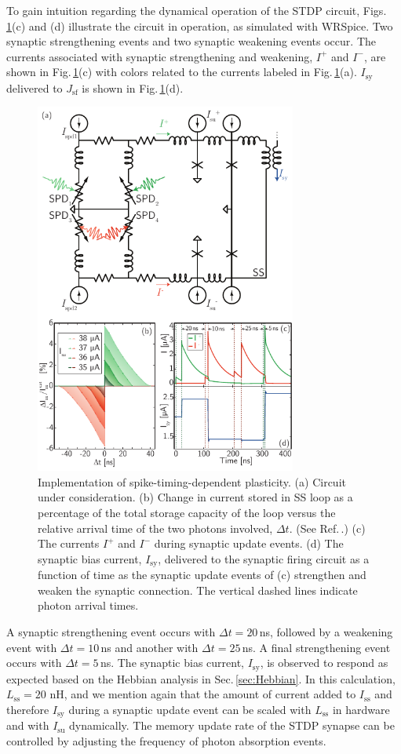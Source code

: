 \documentclass[aip,amsmath,amssymb,reprint,nofootinbib]{revtex4-1}
\begin{document}
To gain intuition regarding the dynamical operation of the STDP circuit, Figs.\,\ref{fig:synapticPlasticity_stdp}(c) and (d) illustrate the circuit in operation, as simulated with WRSpice. Two synaptic strengthening events and two synaptic weakening events occur. The currents associated with synaptic strengthening and weakening, $I^+$ and $I^-$, are shown in Fig.\,\ref{fig:synapticPlasticity_stdp}(c) with colors related to the currents labeled in Fig.\,\ref{fig:synapticPlasticity_stdp}(a). $I_{\mathrm{sy}}$ delivered to $J_{\mathrm{sf}}$ is shown in Fig.\,\ref{fig:synapticPlasticity_stdp}(d). 
\begin{figure}[t!]
	\centerline{\includegraphics[width=8.6cm]{_synapticPlasticity_stdp_small.pdf}}
	\caption{\label{fig:synapticPlasticity_stdp}Implementation of spike-timing-dependent plasticity. (a) Circuit under consideration. (b) Change in current stored in SS loop as a percentage of the total storage capacity of the loop versus the relative arrival time of the two photons involved, $\Delta t$. (See Ref.\,.)  (c) The currents $I^+$ and $I^-$ during synaptic update events. (d) The synaptic bias current, $I_{\mathrm{sy}}$, delivered to the synaptic firing circuit as a function of time as the synaptic update events of (c) strengthen and weaken the synaptic connection. The vertical dashed lines indicate photon arrival times.}
\end{figure}
A synaptic strengthening event occurs with $\Delta t = 20$\,ns, followed by a weakening event with $\Delta t = 10$\,ns and another with $\Delta t = 25$\,ns. A final strengthening event occurs with $\Delta t = 5$\,ns. The synaptic bias current, $I_{\mathrm{sy}}$, is observed to respond as expected based on the Hebbian analysis in Sec.\,\ref{sec:Hebbian}. In this calculation, $L_{\mathrm{ss}} = 20$ nH, and we mention again that the amount of current added to $I_{\mathrm{ss}}$ and therefore $I_{\mathrm{sy}}$ during a synaptic update event can be scaled with $L_{\mathrm{ss}}$ in hardware and with $I_{\mathrm{su}}$ dynamically. The memory update rate of the STDP synapse can be controlled by adjusting the frequency of photon absorption events.
\end{document}
